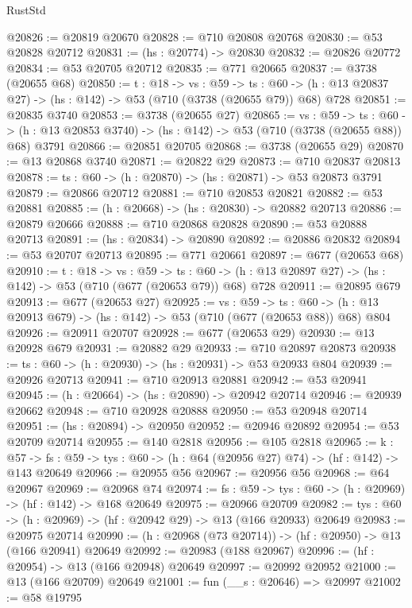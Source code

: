 \begin{lexlean}{RustStd}
\begin{coremodule}
@20826 := @20819 @20670
@20828 := @710 @20808 @20768
@20830 := @53 @20828 @20712
@20831 := (hs : @20774) -> @20830
@20832 := @20826 @20772
@20834 := @53 @20705 @20712
@20835 := @771 @20665
@20837 := @3738 (@20655 @68)
@20850 := {t : @18} ->
  {vs : @59} ->
  {ts : @60} -> (h : @13 @20837 @27) -> (hs : @142) -> @53 (@710 (@3738 (@20655 @79)) @68) @728
@20851 := @20835 @3740
@20853 := @3738 (@20655 @27)
@20865 := {vs : @59} ->
  {ts : @60} -> (h : @13 @20853 @3740) -> (hs : @142) -> @53 (@710 (@3738 (@20655 @88)) @68) @3791
@20866 := @20851 @20705
@20868 := @3738 (@20655 @29)
@20870 := @13 @20868 @3740
@20871 := @20822 @29
@20873 := @710 @20837 @20813
@20878 := {ts : @60} -> (h : @20870) -> (hs : @20871) -> @53 @20873 @3791
@20879 := @20866 @20712
@20881 := @710 @20853 @20821
@20882 := @53 @20881
@20885 := (h : @20668) -> (hs : @20830) -> @20882 @20713
@20886 := @20879 @20666
@20888 := @710 @20868 @20828
@20890 := @53 @20888 @20713
@20891 := (hs : @20834) -> @20890
@20892 := @20886 @20832
@20894 := @53 @20707 @20713
@20895 := @771 @20661
@20897 := @677 (@20653 @68)
@20910 := {t : @18} ->
  {vs : @59} ->
  {ts : @60} -> (h : @13 @20897 @27) -> (hs : @142) -> @53 (@710 (@677 (@20653 @79)) @68) @728
@20911 := @20895 @679
@20913 := @677 (@20653 @27)
@20925 := {vs : @59} ->
  {ts : @60} -> (h : @13 @20913 @679) -> (hs : @142) -> @53 (@710 (@677 (@20653 @88)) @68) @804
@20926 := @20911 @20707
@20928 := @677 (@20653 @29)
@20930 := @13 @20928 @679
@20931 := @20882 @29
@20933 := @710 @20897 @20873
@20938 := {ts : @60} -> (h : @20930) -> (hs : @20931) -> @53 @20933 @804
@20939 := @20926 @20713
@20941 := @710 @20913 @20881
@20942 := @53 @20941
@20945 := (h : @20664) -> (hs : @20890) -> @20942 @20714
@20946 := @20939 @20662
@20948 := @710 @20928 @20888
@20950 := @53 @20948 @20714
@20951 := (hs : @20894) -> @20950
@20952 := @20946 @20892
@20954 := @53 @20709 @20714
@20955 := @140 @2818
@20956 := @105 @2818
@20965 := {k : @57} ->
  {fs : @59} -> {tys : @60} -> (h : @64 (@20956 @27) @74) -> (hf : @142) -> @143 @20649
@20966 := @20955 @56
@20967 := @20956 @56
@20968 := @64 @20967
@20969 := @20968 @74
@20974 := {fs : @59} -> {tys : @60} -> (h : @20969) -> (hf : @142) -> @168 @20649
@20975 := @20966 @20709
@20982 := {tys : @60} -> (h : @20969) -> (hf : @20942 @29) -> @13 (@166 @20933) @20649
@20983 := @20975 @20714
@20990 := (h : @20968 (@73 @20714)) -> (hf : @20950) -> @13 (@166 @20941) @20649
@20992 := @20983 (@188 @20967)
@20996 := (hf : @20954) -> @13 (@166 @20948) @20649
@20997 := @20992 @20952
@21000 := @13 (@166 @20709) @20649
@21001 := fun (__s : @20646) => @20997
@21002 := @58 @19795

\end{coremodule}
\end{lexlean}
